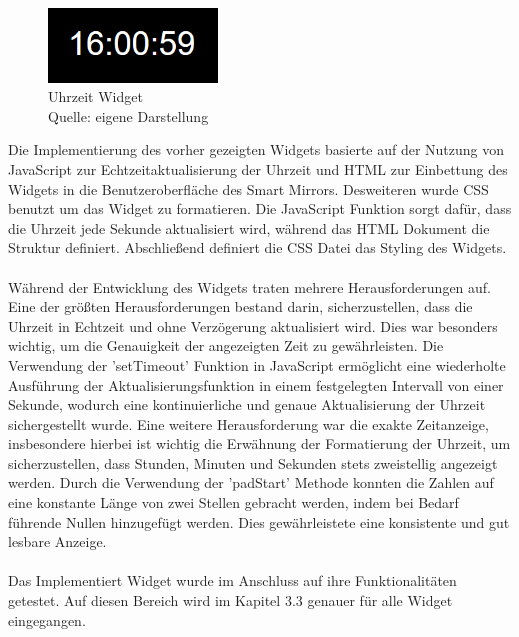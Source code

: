 \begin{figure}[h]
    \centering
    \includegraphics[width=0.4\textwidth]{pictures/time_widget.png}
  \captionsetup{justification=centering, labelformat=simple, singlelinecheck=false}
    \caption[Uhrzeit Widget]{Uhrzeit Widget\\ Quelle: eigene Darstellung}
\end{figure}

\noindent
Die Implementierung des vorher gezeigten Widgets basierte auf der Nutzung von JavaScript zur Echtzeitaktualisierung der Uhrzeit und HTML zur Einbettung des Widgets in die Benutzeroberfläche des Smart Mirrors. Desweiteren wurde CSS benutzt um das Widget zu formatieren. Die JavaScript Funktion sorgt dafür, dass die Uhrzeit jede Sekunde aktualisiert wird, während das HTML Dokument die Struktur definiert. Abschließend definiert die CSS Datei das Styling des Widgets. \\ \\
\noindent
Während der Entwicklung des Widgets traten mehrere Herausforderungen auf. Eine der größten Herausforderungen bestand darin, sicherzustellen, dass die Uhrzeit in Echtzeit und ohne Verzögerung aktualisiert wird. Dies war besonders wichtig, um die Genauigkeit der angezeigten Zeit zu gewährleisten. Die Verwendung der 'setTimeout' Funktion in JavaScript ermöglicht eine wiederholte Ausführung der Aktualisierungsfunktion in einem festgelegten Intervall von einer Sekunde, wodurch eine kontinuierliche und genaue Aktualisierung der Uhrzeit sichergestellt wurde.
Eine weitere Herausforderung war die exakte Zeitanzeige, insbesondere hierbei ist wichtig die Erwähnung der Formatierung der Uhrzeit, um sicherzustellen, dass Stunden, Minuten und Sekunden stets zweistellig angezeigt werden. Durch die Verwendung der 'padStart' Methode konnten die Zahlen auf eine konstante Länge von zwei Stellen gebracht werden, indem bei Bedarf führende Nullen hinzugefügt werden. Dies gewährleistete eine konsistente und gut lesbare Anzeige.\\ \\
\noindent
Das Implementiert Widget wurde im Anschluss auf ihre Funktionalitäten getestet. Auf diesen Bereich wird im Kapitel 3.3 genauer für alle Widget eingegangen.



